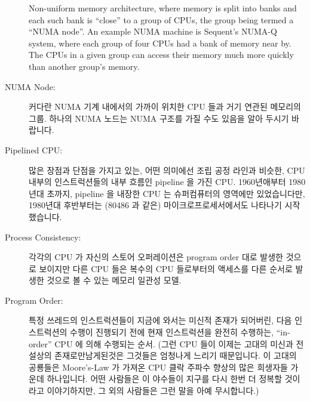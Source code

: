 \begin{description}
	Non-uniform memory architecture, where memory is split into
	banks and each such bank is ``close'' to a group of CPUs,
	the group being termed a ``NUMA node''.
	An example NUMA machine is Sequent's NUMA-Q system, where
	each group of four CPUs had a bank of memory near by.
	The CPUs in a given group can access their memory much
	more quickly than another group's memory.
	\fi
\item[NUMA Node:]
	커다란 NUMA 기계 내에서의 가까이 위치한 CPU 들과 거기 연관된 메모리의
	그룹.
	하나의 NUMA 노드는 NUMA 구조를 가질 수도 있음을 알아 두시기 바랍니다.
	\iffalse

	A group of closely placed CPUs and associated memory within
	a larger NUMA machines.
	Note that a NUMA node might well have a NUCA architecture.
	\fi
\item[Pipelined CPU:]
	많은 장점과 단점을 가지고 있는, 어떤 의미에선 조립 공정 라인과 비슷한,
	CPU 내부의 인스트럭션들의 내부 흐름인 pipeline 을 가진 CPU.
	1960년애부터 1980년대 초까지, pipeline 을 내장한 CPU 는 슈퍼컴퓨터의
	영역에만 있었습니다만, 1980년대 후반부터는 (80486 과 같은)
	마이크로프로세서에서도 나타나기 시작했습니다.
	\iffalse

	A CPU with a pipeline, which is
	an internal flow of instructions internal to the CPU that
	is in some way similar to an assembly line, with many of
	the same advantages and disadvantages.
	In the 1960s through the early 1980s, pipelined CPUs were the
	province of supercomputers, but started appearing in microprocessors
	(such as the 80486) in the late 1980s.
	\fi
\item[Process Consistency:]
	각각의 CPU 가 자신의 스토어 오퍼레이션은 program order 대로 발생한
	것으로 보이지만 다른 CPU 들은 복수의 CPU 들로부터의 액세스를 다른
	순서로 발생한 것으로 볼 수 있는 메모리 일관성 모델.
	\iffalse

	A memory-consistency model in which each CPU's stores appear to
	occur in program order, but in which different CPUs might see
	accesses from more than one CPU as occurring in different orders.
	\fi
\item[Program Order:]
	특정 쓰레드의 인스트럭션들이 지금에 와서는 미신적 존재가 되어버린, 다음
	인스트럭션의 수행이 진행되기 전에 현재 인스트럭션을 완전히 수행하는,
	``in-order'' CPU 에 의해 수행되는 순서.
	(그런 CPU 들이 이제는 고대의 미신과 전설상의 존재로만남게된것은
	그것들은 엄청나게 느리기 때문입니다.
	이 고대의 공룡들은 Moore's-Law 가 가져온 CPU 클락 주파수 향상의 많은
	희생자들 가운데 하나입니다.
	어떤 사람들은 이 야수들이 지구를 다시 한번 더 정복할 것이라고
	이야기하지만, 그 외의 사람들은 그런 말을 아예 무시합니다.)
	\iffalse


\end{description}
